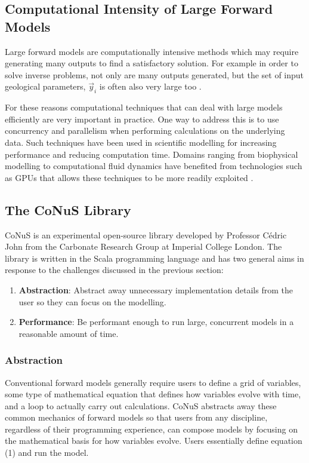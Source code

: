 \documentclass[12pt]{article}
\begin{document}
	\subsection{Computational Intensity of Large Forward Models}
	Large forward models are computationally intensive methods which may require generating many outputs to find a satisfactory solution. For example in order to solve inverse problems, not only are many outputs generated, but the set of input geological parameters, $\vec y_i$ is often also very large too \autocite{10.1260/0144598011492363}.
	
	For these reasons computational techniques that can deal with large models efficiently are very important in practice. One way to address this is to use concurrency and parallelism when performing calculations on the underlying data. Such techniques have been used in scientific modelling for increasing performance and reducing computation time. Domains ranging from biophysical modelling to computational fluid dynamics have benefited from technologies such as GPUs that allows these techniques to be more readily exploited \autocite{4490127}.
	
	\subsection{The CoNuS Library}
	CoNuS is an experimental open-source library developed by Professor Cédric John from the Carbonate Research Group at Imperial College London. The library is written in the Scala programming language and has two general aims in response to the challenges discussed in the previous section:
	
	\begin{enumerate}
		\item \textbf{Abstraction}: Abstract away unnecessary implementation details from the user so they can focus on the modelling.
		\item \textbf{Performance}: Be performant enough to run large, concurrent models in a reasonable amount of time.
	\end{enumerate}
	
	\subsubsection{Abstraction}
	Conventional forward models generally require users to define a grid of variables, some type of mathematical equation that defines how variables evolve with time, and a loop to actually carry out calculations. CoNuS abstracts away these common mechanics of forward models so that users from any discipline, regardless of their programming experience, can compose models by focusing on the mathematical basis for how variables evolve. Users essentially define equation (1) and run the model.
	
\end{document}
